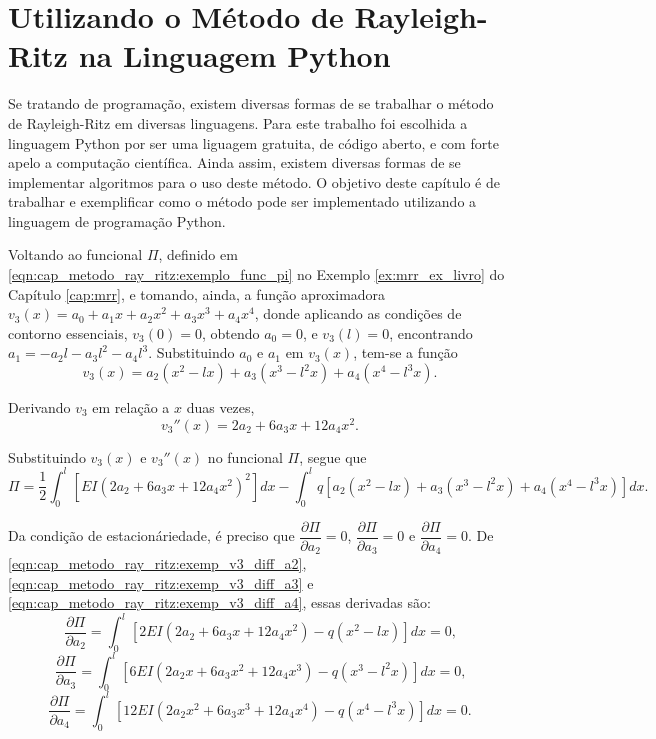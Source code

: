 \documentclass[
	12pt,				%
	openright,			%
    twoside,			%
	a4paper,			%
	english,			%
	french,				%
	spanish,			%
	brazil				%
	]{abntex2}
\numberwithin{lema}{chapter}
\numberwithin{teorema}{chapter}
\numberwithin{definicao}{chapter}
\numberwithin{exemplo}{chapter}
\numberwithin{figure}{chapter}
\begin{document}
\chapter{Utilizando o Método de Rayleigh-Ritz na Linguagem Python}

Se tratando de programação, existem diversas formas de se trabalhar o método de Rayleigh-Ritz em diversas linguagens. Para este trabalho foi escolhida a linguagem Python por ser uma liguagem gratuita, de código aberto, e com forte apelo a computação científica. Ainda assim, existem diversas formas de se implementar algoritmos para o uso deste método. O objetivo deste capítulo é de trabalhar e exemplificar como o método pode ser implementado utilizando a linguagem de programação Python.

Voltando ao funcional $\Pi$, definido em \eqref{eqn:cap_metodo_ray_ritz:exemplo_func_pi} no Exemplo \ref{ex:mrr_ex_livro} do Capítulo \ref{cap:mrr}, e tomando, ainda, a função aproximadora $v_3(x)=a_0+a_1 x + a_2 x^2 + a_3 x^3 + a_4 x^4$, donde aplicando as condições de contorno essenciais, $v_3(0)=0$, obtendo $a_0=0$, e $v_3(l)=0$, encontrando $a_1=-a_2l-a_3l^2-a_4l^3$. Substituindo $a_0$ e $a_1$ em $v_3(x)$, tem-se a função
$$
	v_3(x)=
	a_2 (x^2 - lx)
	+
	a_3 (x^3 - l^2x)
	+
	a_4 (x^4 - l^3x)
	\text{.}
$$

Derivando $v_3$ em relação a $x$ duas vezes,
$$
	v_3''(x)=
	2a_2
	+
	6a_3 x
	+
	12a_4 x^2
	\text{.}
$$
	
Substituindo $v_3(x)$ e $v_3''(x)$ no funcional $\Pi$, segue que
$$
	\Pi = \frac{1}{2} \int_0^l \left [
    	EI(2a_2+6a_3x+12a_4x^2)^2
	\right ] dx
	-
	\int_0^l q \left [
		a_2(x^2 - lx)
		+
		a_3(x^3 - l^2x)
		+
		a_4(x^4 - l^3x)
	\right ] dx
	\text{.}
$$

Da condição de estacionáriedade, é preciso que $\dfrac{\partial\Pi}{\partial a_2}=0$, $\dfrac{\partial\Pi}{\partial a_3}=0$ e $\dfrac{\partial \Pi}{\partial a_4}=0$. De \eqref{eqn:cap_metodo_ray_ritz:exemp_v3_diff_a2}, \eqref{eqn:cap_metodo_ray_ritz:exemp_v3_diff_a3} e \eqref{eqn:cap_metodo_ray_ritz:exemp_v3_diff_a4}, essas derivadas são:
\begin{equation}
	\label{eqn:cap_mrr_python:do_ex1_partial_pi_a2}
	\frac{\partial \Pi}{\partial a_2}
	=
	\int_0^l \left [
		2EI(2a_2 + 6a_3x + 12a_4x^2)
		-
		q(x^2 - lx)
	\right ] dx
	= 0
	\text{,}
\end{equation}
\begin{equation}
	\label{eqn:cap_mrr_python:do_ex1_partial_pi_a3}
	\frac{\partial \Pi}{\partial a_3}
	=
	\int_0^l \left [
		6EI(2a_2x + 6a_3x^2 + 12a_4x^3)
		-
		q(x^3 - l^2x)
	\right ] dx
	= 0
	\text{,}
\end{equation}
\begin{equation}
	\label{eqn:cap_mrr_python:do_ex1_partial_pi_a4}
	\frac{\partial \Pi}{\partial a_4}
	=
	\int_0^l \left [
		12EI(2a_2x^2 + 6a_3x^3 + 12a_4x^4)
		-
		q(x^4 - l^3x)
	\right ] dx
	= 0
	\text{.}
\end{equation}
\end{document}

